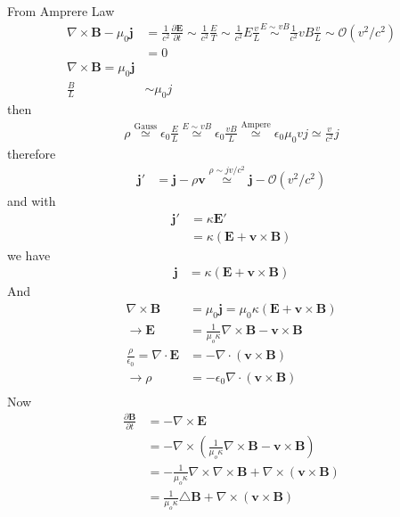 \documentclass[../main.tex]{subfiles}
\begin{document}
From Amprere Law
\begin{align}
\nabla\times\mathbf{B}-\mu_0\mathbf{j}&=\frac{1}{c^2}\frac{\partial\mathbf{E}}{\partial t}\sim\frac{1}{c^2}\frac{E}{T}\sim\frac{1}{c^2}E\frac{v}{L}\overset{E\sim vB}{\sim}\frac{1}{c^2}vB\frac{v}{L}\sim\mathcal{O}(v^2/c^2)\\
&=0\\
\nabla\times\mathbf{B}=\mu_0\mathbf{j}\\
\frac{B}{L}&\sim\mu_0j
\end{align}
then
\begin{align}
\rho
\overset{\text{Gauss}}{\simeq}\epsilon_0\frac{E}{L}
\overset{E\sim vB}{\simeq}\epsilon_0\frac{vB}{L}
\overset{\text{Ampere}}{\simeq}\epsilon_0\mu_0 vj
\simeq\frac{v}{c^2}j
\end{align}
therefore
\begin{align}
\mathbf{j}'&=\mathbf{j}-\rho\mathbf{v}
\overset{\rho\sim jv/c^2}{\simeq}\mathbf{j}-\mathcal{O}(v^2/c^2)
\end{align}
and with
\begin{align}
\mathbf{j}'
&=\kappa\mathbf{E}'\\
&=\kappa(\mathbf{E}+\mathbf{v}\times\mathbf{B})
\end{align}
we have
\begin{align}
\mathbf{j}&=\kappa(\mathbf{E}+\mathbf{v}\times\mathbf{B})
\end{align}
And
\begin{align}
\nabla\times\mathbf{B}&=\mu_0\mathbf{j}=\mu_0\kappa(\mathbf{E}+\mathbf{v}\times\mathbf{B})\\
\rightarrow\mathbf{E}&=\frac{1}{\mu_o\kappa}\nabla\times\mathbf{B}-\mathbf{v}\times\mathbf{B}\\
\frac{\rho}{\epsilon_0}=\nabla\cdot\mathbf{E}&=-\nabla\cdot(\mathbf{v}\times\mathbf{B})\\
\rightarrow\rho&=-\epsilon_0\nabla\cdot(\mathbf{v}\times\mathbf{B})\\
\end{align}
Now
\begin{align}
\frac{\partial\mathbf{B}}{\partial t}
&=-\nabla\times\mathbf{E}\\
&=-\nabla\times\left(\frac{1}{\mu_o\kappa}\nabla\times\mathbf{B}-\mathbf{v}\times\mathbf{B}\right)\\
&=-\frac{1}{\mu_o\kappa}\nabla\times\nabla\times\mathbf{B}+\nabla\times(\mathbf{v}\times\mathbf{B})\\
&=\frac{1}{\mu_o\kappa}\triangle\mathbf{B}+\nabla\times(\mathbf{v}\times\mathbf{B})
\end{align}
\end{document}
